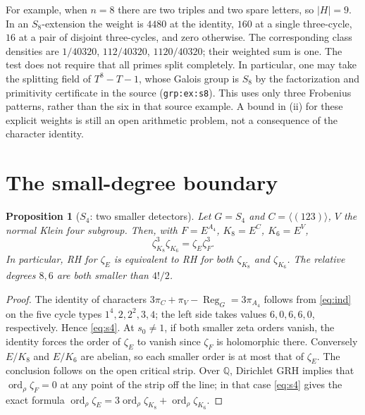 \documentclass[11pt]{article}
\newtheorem{proposition}[theorem]{Proposition}
\theoremstyle{remark}\newtheorem{remark}[theorem]{Remark}
\newcommand{\Reg}{\operatorname{Reg}}
\newcommand{\ord}{\operatorname{ord}}
\newcommand{\Q}{\mathbb Q}
\begin{document}
For example, when $n=8$ there are two triples and two spare letters, so
$|H|=9$. In an $S_8$-extension the weight is $4480$ at the identity,
$160$ at a single three-cycle, $16$ at a pair of disjoint three-cycles, and
zero otherwise. The corresponding class densities are $1/40320$, $112/40320$,
$1120/40320$; their weighted sum is one. The test does not require that all
primes split completely. In particular, one may take the splitting field of
$T^8-T-1$, whose Galois group is $S_8$ by the factorization and primitivity
certificate in the source (\texttt{grp:ex:s8}). This uses only three
Frobenius patterns, rather than the six in that source example. A bound in (ii) for these explicit weights is still
an open arithmetic problem, not a consequence of the character identity.

\section{The small-degree boundary}
\begin{proposition}[$S_4$: two smaller detectors]\label{prop:s4}
Let $G=S_4$ and $C=\langle(123)\rangle$, $V$ the normal Klein four subgroup.
Then, with $F=E^{A_4}$, $K_8=E^C$, $K_6=E^V$,
\begin{equation}\label{eq:s4}
 \zeta_{K_8}^3\zeta_{K_6}=\zeta_E\zeta_F^3.
\end{equation}
In particular, RH for $\zeta_E$ is equivalent to RH for both $\zeta_{K_8}$
and $\zeta_{K_6}$. The relative degrees $8,6$ are both smaller than $4!/2$.
\end{proposition}
\begin{proof}
The identity of characters $3\pi_C+\pi_V-\Reg_G=3\pi_{A_4}$ follows from
\eqref{eq:ind} on the five cycle types $1^4,2,2^2,3,4$; the left side takes
values $6,0,6,6,0$, respectively. Hence \eqref{eq:s4}. At $s_0\ne1$, if both
smaller zeta orders vanish, the identity forces the order of $\zeta_E$ to vanish
since $\zeta_F$ is holomorphic there. Conversely $E/K_8$ and $E/K_6$ are
abelian, so each smaller order is at most that of $\zeta_E$. The conclusion
follows on the open critical strip. Over $\Q$, Dirichlet GRH implies that
$\ord_\rho\zeta_F=0$ at any point of the strip off the line; in that case
\eqref{eq:s4} gives the exact formula
$\ord_\rho\zeta_E=3\ord_\rho\zeta_{K_8}+\ord_\rho\zeta_{K_6}$.
\end{proof}
\end{document}
